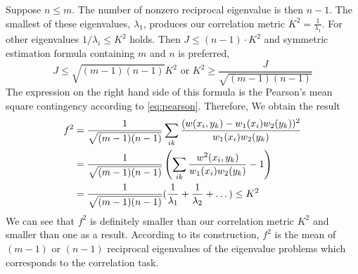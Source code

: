 \documentclass{article}
\begin{document}
Suppose $n\leq m$. The number of nonzero reciprocal eigenvalue is
then $n-1$.
The smallest of these eigenvalues, $\lambda_1$,
produces our correlation metric $K^2 = \frac{1}{\lambda_1}$.
For other eigenvalues $1/\lambda_i \leq K^2$ holds. Then $J \leq (n-1)\cdot K^2$ and symmetric estimation formula containing $m$ and $n$ is preferred,
$$
J \leq \sqrt{(m-1)(n-1)} K^2 \textrm{ or } K^2 \geq \frac{J}{\sqrt{(m-1)(n-1)} }
$$
The expression on the right hand side of this formula is the Pearson's
mean square contingency according to \eqref{eq:pearson}. Therefore, We obtain the result
\begin{align}
       f^2 &= \frac{1}{\sqrt{(m-1)(n-1)}}\sum_{ik}
   \frac{(w(x_i,y_k)-w_1(x_i)w_2(y_k))^2}{w_1(x_i)w_2(y_k)} \notag \\
   &=\frac{1}{\sqrt{(m-1)(n-1)}}\left(\sum_{ik}
   \frac{w^2(x_i,y_k)}{w_1(x_i)w_2(y_k)} -1\right) \\
   &=\frac{1}{\sqrt{(m-1)(n-1)}}(\frac{1}{\lambda_1}
   + \frac{1}{\lambda_2} + \dots ) \leq K^2 \notag
\end{align}
We can see that $f^2$ is definitely smaller than our correlation
metric $K^2$ and smaller than one as a result. According to its
construction, $f^2$
is the mean of $(m-1)$ or $(n-1)$ reciprocal eigenvalues of the eigenvalue
problems which corresponds to the correlation task.
\end{document}
